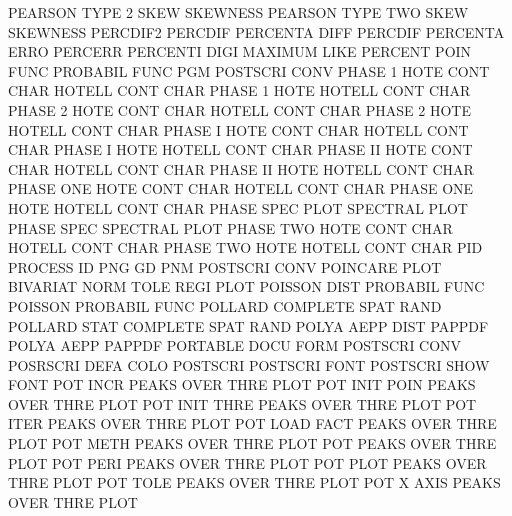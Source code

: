 PEARSON  TYPE 2    SKEW                 SKEWNESS
PEARSON  TYPE TWO  SKEW                 SKEWNESS
PERCDIF2                                PERCDIF
PERCENTA DIFF                           PERCDIF
PERCENTA ERRO                           PERCERR
PERCENTI DIGI                           MAXIMUM  LIKE
PERCENT  POIN FUNC                      PROBABIL FUNC
PGM                                     POSTSCRI CONV
PHASE    1    HOTE CONT CHAR            HOTELL   CONT CHAR
PHASE    1    HOTE                      HOTELL   CONT CHAR
PHASE    2    HOTE CONT CHAR            HOTELL   CONT CHAR
PHASE    2    HOTE                      HOTELL   CONT CHAR
PHASE    I    HOTE CONT CHAR            HOTELL   CONT CHAR
PHASE    I    HOTE                      HOTELL   CONT CHAR
PHASE    II   HOTE CONT CHAR            HOTELL   CONT CHAR
PHASE    II   HOTE                      HOTELL   CONT CHAR
PHASE    ONE  HOTE CONT CHAR            HOTELL   CONT CHAR
PHASE    ONE  HOTE                      HOTELL   CONT CHAR
PHASE    SPEC PLOT                      SPECTRAL PLOT
PHASE    SPEC                           SPECTRAL PLOT
PHASE    TWO  HOTE CONT CHAR            HOTELL   CONT CHAR
PHASE    TWO  HOTE                      HOTELL   CONT CHAR
PID                                     PROCESS  ID
PNG                                     GD
PNM                                     POSTSCRI CONV
POINCARE PLOT                           BIVARIAT NORM TOLE REGI PLOT
POISSON  DIST                           PROBABIL FUNC
POISSON                                 PROBABIL FUNC
POLLARD                                 COMPLETE SPAT RAND
POLLARD  STAT                           COMPLETE SPAT RAND
POLYA    AEPP DIST                      PAPPDF
POLYA    AEPP                           PAPPDF
PORTABLE DOCU FORM                      POSTSCRI CONV
POSRSCRI DEFA COLO                      POSTSCRI
POSTSCRI FONT                           POSTSCRI SHOW FONT
POT      INCR                           PEAKS    OVER THRE PLOT
POT      INIT POIN                      PEAKS    OVER THRE PLOT
POT      INIT THRE                      PEAKS    OVER THRE PLOT
POT      ITER                           PEAKS    OVER THRE PLOT
POT      LOAD FACT                      PEAKS    OVER THRE PLOT
POT      METH                           PEAKS    OVER THRE PLOT
POT                                     PEAKS    OVER THRE PLOT
POT      PERI                           PEAKS    OVER THRE PLOT
POT      PLOT                           PEAKS    OVER THRE PLOT
POT      TOLE                           PEAKS    OVER THRE PLOT
POT      X    AXIS                      PEAKS    OVER THRE PLOT
